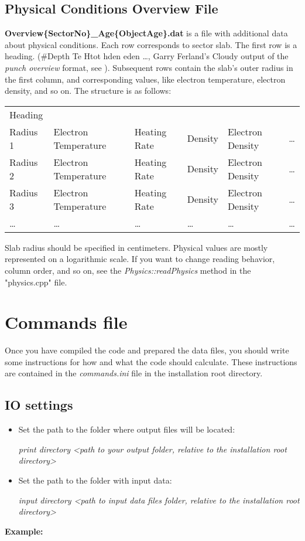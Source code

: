 \documentclass[a4paper]{article}
\begin{document}
\subsection{Physical Conditions Overview File}
\label{dataOverview}
{\bf Overview\{SectorNo\}\_Age\{ObjectAge\}.dat} is a file with additional data about physical conditions. Each row
corresponds to sector slab. The first row is a heading.
(\#Depth Te Htot hden eden \ldots, Garry Ferland's Cloudy output of the {\it punch overview}
format, see \cite{Cloudy}). Subsequent rows contain the slab's outer radius in the first column,
and corresponding values, like electron temperature, electron density, and so on. The structure is as follows:
\begin{table}[H]
    \begin{tabular}{llllll}
        Heading & & & & & \\
        Radius 1 & Electron Temperature & Heating Rate & Density & Electron Density & \ldots \\
        Radius 2 & Electron Temperature & Heating Rate & Density & Electron Density & \ldots \\
        Radius 3 & Electron Temperature & Heating Rate & Density & Electron Density & \ldots \\
        \ldots & \ldots & \ldots & \ldots & \ldots & \ldots \\
    \end{tabular}
\end{table}
Slab radius should be specified in centimeters. Physical values are mostly represented on a logarithmic scale. If you want to change reading behavior, column order, and so on, see the {\it Physics::readPhysics} method in the "physics.cpp" file.

\section{Commands file}

Once you have compiled the code and prepared the data files, you should write some instructions for how and what the code should calculate. These instructions are contained in the {\it commands.ini} file in the installation root directory.

\subsection{IO settings}
\begin{itemize}
    \item Set the path to the folder where output files will be located: \\
    \centerline{\it print directory <path to your output folder, relative to the installation root directory>}
    \item Set the path to the folder with input data: \\
    \centerline{\it input directory <path to input data files folder, relative to the installation root directory>}
\end{itemize}
{\bf Example:}
\vspace{0.25cm}
\end{document}
